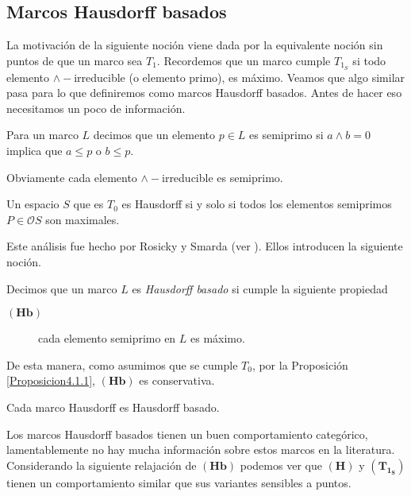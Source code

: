 \documentclass{comunicaciones}
\begin{document}
\subsection{Marcos Hausdorff basados}

La motivación de la siguiente noción viene dada por la equivalente noción sin puntos de que un marco sea $T_1$. Recordemos que un marco cumple $T_{1_S}$ si todo elemento $\wedge-$irreducible (o elemento primo), es máximo. Veamos que algo similar pasa para lo que definiremos como marcos Hausdorff basados. Antes de hacer eso necesitamos un poco de información.

\begin{dfn}\label{Semiprimo}
    Para un marco $L$ decimos que un elemento $p\in L$ es semiprimo si $a\wedge b=0$ implica que $a\leq p$ o $b\leq p$.
\end{dfn}

Obviamente cada elemento $\wedge-$irreducible es semiprimo. 

\begin{prop}\label{Proposicion4.1.1}
    Un espacio $S$ que es $T_0$ es Hausdorff si y solo si todos los elementos semiprimos $P\in \mathcal{O}S$ son maximales.
\end{prop}

Este análisis fue hecho por Rosicky y Smarda (ver \cite{Ro.S.}). Ellos introducen la siguiente noción.

\begin{dfn}
    Decimos que un marco $L$ es \emph{Hausdorff basado} si cumple la siguiente propiedad
    \begin{description}
        \item[$\mathbf{(Hb)}$] cada elemento semiprimo en $L$ es máximo. 
    \end{description}
\end{dfn}

De esta manera, como asumimos que se cumple $T_0$, por la Proposición \ref{Proposicion4.1.1}, $\mathbf{(Hb)}$ es conservativa.

\begin{prop}\label{Proposición4.2}
    Cada marco Hausdorff es Hausdorff basado.
\end{prop}

Los marcos Hausdorff basados tienen un buen comportamiento categórico, lamentablemente no hay mucha información sobre estos marcos en la literatura.\\

Considerando la siguiente relajación de $\mathbf{(Hb)}$ podemos ver que $\mathbf{(H)}$ y $\mathbf{(T_{1_S})}$ tienen un comportamiento similar que sus variantes sensibles a puntos.
\end{document}
